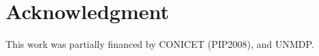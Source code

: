 \documentclass[conference]{IEEEtran}
\begin{document}
\section*{Acknowledgment}

This work was partially financed by CONICET (PIP2008),  and UNMDP.



%
%


\end{document}
